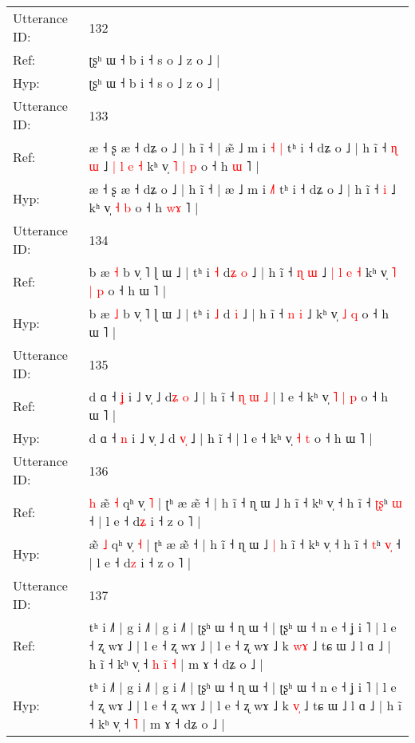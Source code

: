 \documentclass[10pt]{article}
\DeclareRobustCommand{\hl}[1]{{\textcolor{red}{#1}}}
\begin{document}
\begin{longtable}{ll}
\midrule
Utterance ID: & 132 \\
Ref: & ʈʂʰ ɯ ˧ b i ˧ s o ˩ z o ˩ |
 \\
Hyp: & ʈʂʰ ɯ ˧ b i ˧ s o ˩ z o ˩ |
 \\
\midrule
Utterance ID: & 133 \\
Ref: & æ ˧ ʂ æ ˧ dʑ o ˩ | h ĩ ˧ | æ\hl{̃} ˩ m i \hl{˧}\hl{ }\hl{|} tʰ i ˧ dʑ o ˩ | h ĩ ˧\hl{ }\hl{ɳ} \hl{ɯ} ˩\hl{ }\hl{|}\hl{ }\hl{l}\hl{ }\hl{e}\hl{ }\hl{˧} kʰ v̩\hl{ }\hl{˥} \hl{|} \hl{p} o ˧ h \hl{}\hl{ɯ} ˥ |
 \\
Hyp: & æ ˧ ʂ æ ˧ dʑ o ˩ | h ĩ ˧ | æ\hl{} ˩ m i \hl{}\hl{˩}\hl{˥} tʰ i ˧ dʑ o ˩ | h ĩ ˧\hl{}\hl{} \hl{i} ˩\hl{}\hl{}\hl{}\hl{}\hl{}\hl{}\hl{}\hl{} kʰ v̩\hl{}\hl{} \hl{˧} \hl{b} o ˧ h \hl{w}\hl{ɤ} ˥ |
 \\
\midrule
Utterance ID: & 134 \\
Ref: & b æ \hl{˧} b v̩ ˥ ɭ ɯ ˩ | tʰ i \hl{˧} d\hl{ʑ} \hl{o} ˩ | h ĩ ˧ \hl{ɳ} \hl{ɯ} ˩\hl{ }\hl{|}\hl{ }\hl{l}\hl{ }\hl{e}\hl{ }\hl{˧} kʰ v̩\hl{ }\hl{˥} \hl{|} \hl{p} o ˧ h ɯ ˥ |
 \\
Hyp: & b æ \hl{˩} b v̩ ˥ ɭ ɯ ˩ | tʰ i \hl{˩} d\hl{} \hl{i} ˩ | h ĩ ˧ \hl{n} \hl{i} ˩\hl{}\hl{}\hl{}\hl{}\hl{}\hl{}\hl{}\hl{} kʰ v̩\hl{}\hl{} \hl{˩} \hl{q} o ˧ h ɯ ˥ |
 \\
\midrule
Utterance ID: & 135 \\
Ref: & d ɑ ˧ \hl{ʝ} i ˩ v̩ ˩ d\hl{ʑ}\hl{ }\hl{o} ˩ | h ĩ ˧\hl{ }\hl{ɳ}\hl{ }\hl{ɯ}\hl{ }\hl{˩} | l e ˧ kʰ v̩\hl{ }\hl{˥} \hl{|} \hl{p} o ˧ h ɯ ˥ |
 \\
Hyp: & d ɑ ˧ \hl{n} i ˩ v̩ ˩ d\hl{ }\hl{v}\hl{̩} ˩ | h ĩ ˧\hl{}\hl{}\hl{}\hl{}\hl{}\hl{} | l e ˧ kʰ v̩\hl{}\hl{} \hl{˧} \hl{t} o ˧ h ɯ ˥ |
 \\
\midrule
Utterance ID: & 136 \\
Ref: & \hl{h}\hl{ }æ̃ \hl{˧} qʰ v̩ \hl{˥} | ʈʰ æ æ̃ ˧ | h ĩ ˧ ɳ ɯ ˩\hl{}\hl{} h ĩ ˧ kʰ v̩ ˧ h ĩ ˧ \hl{ʈ}\hl{ʂ}ʰ \hl{}\hl{ɯ} ˧ | l e ˧ d\hl{ʑ} i ˧ z o ˥ |
 \\
Hyp: & \hl{}\hl{}æ̃ \hl{˩} qʰ v̩ \hl{˧} | ʈʰ æ æ̃ ˧ | h ĩ ˧ ɳ ɯ ˩\hl{ }\hl{|} h ĩ ˧ kʰ v̩ ˧ h ĩ ˧ \hl{}\hl{t}ʰ \hl{v}\hl{̩} ˧ | l e ˧ d\hl{z} i ˧ z o ˥ |
 \\
\midrule
Utterance ID: & 137 \\
Ref: & tʰ i ˩˥ | g i ˩˥ | g i ˩˥ | ʈʂʰ ɯ ˧ ɳ ɯ ˧ | ʈʂʰ ɯ ˧ n e ˧ ʝ i ˥ | l e ˧ ʐ wɤ ˩ | l e ˧ ʐ wɤ ˩ | l e ˧ ʐ wɤ ˩ k \hl{w}\hl{ɤ} ˩ tɕ ɯ ˩ l ɑ ˩ | h ĩ ˧ kʰ v̩ ˧\hl{ }\hl{h}\hl{ }\hl{i}\hl{̃} \hl{˧} | m ɤ ˧ dʑ o ˩ |
 \\
Hyp: & tʰ i ˩˥ | g i ˩˥ | g i ˩˥ | ʈʂʰ ɯ ˧ ɳ ɯ ˧ | ʈʂʰ ɯ ˧ n e ˧ ʝ i ˥ | l e ˧ ʐ wɤ ˩ | l e ˧ ʐ wɤ ˩ | l e ˧ ʐ wɤ ˩ k \hl{v}\hl{̩} ˩ tɕ ɯ ˩ l ɑ ˩ | h ĩ ˧ kʰ v̩ ˧\hl{}\hl{}\hl{}\hl{}\hl{} \hl{˥} | m ɤ ˧ dʑ o ˩ |

\end{longtable}
\end{document}
